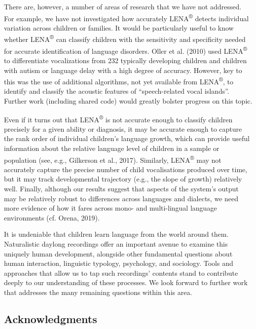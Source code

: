 \documentclass[english,floatsintext,man]{apa6}
\begin{document}
There are, however, a number of areas of research that we have not
addressed. For example, we have not investigated how accurately
LENA\textsuperscript{®} detects individual variation across children or
families. It would be particularly useful to know whether
LENA\textsuperscript{®} can classify children with the sensitivity and
specificity needed for accurate identification of language disorders.
Oller et al. (2010) used LENA\textsuperscript{®} to differentiate
vocalizations from 232 typically developing children and children with
autism or language delay with a high degree of accuracy. However, key to
this was the use of additional algorithms, not yet available from
LENA\textsuperscript{®}, to identify and classify the acoustic features
of \enquote{speech-related vocal islands}. Further work (including
shared code) would greatly bolster progress on this topic.

Even if it turns out that LENA\textsuperscript{®} is not accurate enough
to classify children precisely for a given ability or diagnosis, it may
be accurate enough to capture the rank order of individual children's
language growth, which can provide useful information about the relative
language level of children in a sample or population (see, e.g.,
Gilkerson et al., 2017). Similarly, LENA\textsuperscript{®} may not
accurately capture the precise number of child vocalisations produced
over time, but it may track developmental trajectory (e.g., the slope of
growth) relatively well. Finally, although our results suggest that
aspects of the system's output may be relatively robust to differences
across languages and dialects, we need more evidence of how it fares
across mono- and multi-lingual language environments (cf. Orena, 2019).

It is undeniable that children learn language from the world around
them. Naturalistic daylong recordings offer an important avenue to
examine this uniquely human development, alongside other fundamental
questions about human interaction, linguistic typology, psychology, and
sociology. Tools and approaches that allow us to tap such recordings'
contents stand to contribute deeply to our understanding of these
processes. We look forward to further work that addresses the many
remaining questions within this area.

\subsection{Acknowledgments}\label{acknowledgments}
\end{document}
